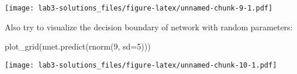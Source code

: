 \documentclass[
  a4paper,
]{article}
\newenvironment{Shaded}{\begin{snugshade}}{\end{snugshade}}
\newcommand{\AttributeTok}[1]{\textcolor[rgb]{0.77,0.63,0.00}{#1}}
\newcommand{\DecValTok}[1]{\textcolor[rgb]{0.00,0.00,0.81}{#1}}
\newcommand{\FunctionTok}[1]{\textcolor[rgb]{0.00,0.00,0.00}{#1}}
\newcommand{\NormalTok}[1]{#1}
\begin{document}
\texttt{[image: lab3-solutions\_files/figure-latex/unnamed-chunk-9-1.pdf]}

Also try to visualize the decision boundary of network with random
parameters:

\begin{Shaded}
\begin{Highlighting}[]
\FunctionTok{plot\_grid}\NormalTok{(}\FunctionTok{nnet.predict}\NormalTok{(}\FunctionTok{rnorm}\NormalTok{(}\DecValTok{9}\NormalTok{, }\AttributeTok{sd=}\DecValTok{5}\NormalTok{)))}
\end{Highlighting}
\end{Shaded}

\texttt{[image: lab3-solutions\_files/figure-latex/unnamed-chunk-10-1.pdf]}
\end{document}

